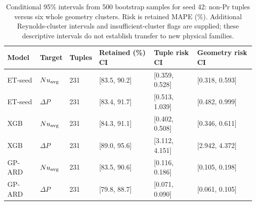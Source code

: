\begin{table}[htbp]\centering\scriptsize\caption{Conditional 95\% intervals from 500 bootstrap samples for seed 42: non-Pr tuples versus six whole geometry clusters. Risk is retained MAPE (\%). Additional Reynolds-cluster intervals and insufficient-cluster flags are supplied; these descriptive intervals do not establish transfer to new physical families.}\label{tab:intervals}
\begin{tabular}{llllll}\toprule
Model & Target & Tuples & Retained (\%) CI & Tuple risk CI & Geometry risk CI\\\midrule
ET-seed & $Nu_{\rm avg}$ & 231 & [83.5, 90.2] & [0.359, 0.528] & [0.318, 0.593]\\
ET-seed & $\Delta P$ & 231 & [83.4, 91.7] & [0.513, 1.039] & [0.482, 0.999]\\
XGB & $Nu_{\rm avg}$ & 231 & [84.3, 91.1] & [0.402, 0.508] & [0.346, 0.611]\\
XGB & $\Delta P$ & 231 & [89.0, 95.6] & [3.112, 4.151] & [2.942, 4.372]\\
GP-ARD & $Nu_{\rm avg}$ & 231 & [83.5, 90.6] & [0.116, 0.186] & [0.105, 0.198]\\
GP-ARD & $\Delta P$ & 231 & [79.8, 88.7] & [0.071, 0.090] & [0.061, 0.105]\\
\bottomrule\end{tabular}\end{table}
